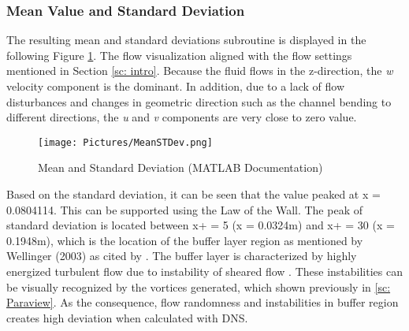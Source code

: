 \documentclass[11pt]{article}
\begin{document}
\subsubsection{Mean Value and Standard Deviation}
The resulting mean and standard deviations subroutine is displayed in the following Figure \ref{fig: MeanSTDev}. The flow visualization aligned with the flow settings mentioned in Section \ref{sc: intro}. Because the fluid flows in the z-direction, the \textit{w} velocity component is the dominant. In addition, due to a lack of flow disturbances and changes in geometric direction such as the channel bending to different directions, the \textit{u} and \textit{v} components are very close to zero value.
\begin{figure}[ht]
    \centering
    \texttt{[image: Pictures/MeanSTDev.png]}
    \caption{Mean and Standard Deviation (MATLAB Documentation)}
    \label{fig: MeanSTDev}
\end{figure}
\noindent Based on the standard deviation, it can be seen that the value peaked at x = 0.0804114. This can be supported using the Law of the Wall. The peak of standard deviation is located between x+ = 5 (x = 0.0324m) and x+ = 30 (x = 0.1948m), which is the location of the buffer layer region as mentioned by Wellinger (2003) as cited by \citet{Kralik2017}. The buffer layer is characterized by highly energized turbulent flow due to instability of sheared flow \citep{Southard2023}. These instabilities can be visually recognized by the vortices generated, which shown previously in \ref{sc: Paraview}. As the consequence, flow randomness and instabilities in buffer region creates high deviation when calculated with DNS.
\end{document}
